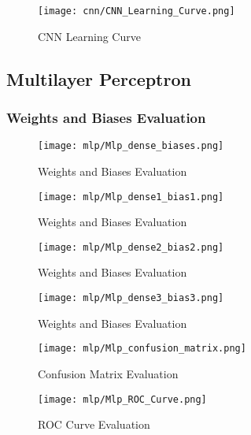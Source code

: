\begin{figure}[H] 
  \centering
  \texttt{[image: cnn/CNN\_Learning\_Curve.png]}
  \caption{CNN Learning Curve}\label{fig:cnn_learning_curve}
\end{figure}

\subsection{Multilayer Perceptron}\label{mlp_visual}

\subsubsection{Weights and Biases Evaluation}\label{mlp_weights_biases}

\begin{figure}[H] 
  \centering
  \texttt{[image: mlp/Mlp\_dense\_biases.png]}
  \caption{Weights and Biases Evaluation}\label{fig:mlp_weights_biases}
\end{figure}

\begin{figure}[H] 
  \centering
  \texttt{[image: mlp/Mlp\_dense1\_bias1.png]}
  \caption{Weights and Biases Evaluation}\label{fig:dense1_bias1}
\end{figure}

\begin{figure}[H] 
  \centering
  \texttt{[image: mlp/Mlp\_dense2\_bias2.png]}
  \caption{Weights and Biases Evaluation}\label{fig:dense2_bias2}
\end{figure}

\begin{figure}[H] 
  \centering
  \texttt{[image: mlp/Mlp\_dense3\_bias3.png]}
  \caption{Weights and Biases Evaluation}\label{fig:dense3_bias3}
\end{figure}

\begin{figure}[H] 
  \centering
  \texttt{[image: mlp/Mlp\_confusion\_matrix.png]}
  \caption{Confusion Matrix Evaluation}\label{fig:mpl_confusion_matrix}
\end{figure}

\begin{figure}[H] 
  \centering
  \texttt{[image: mlp/Mlp\_ROC\_Curve.png]}
  \caption{ROC Curve Evaluation}\label{fig:mpl_roc_curve}
\end{figure}
